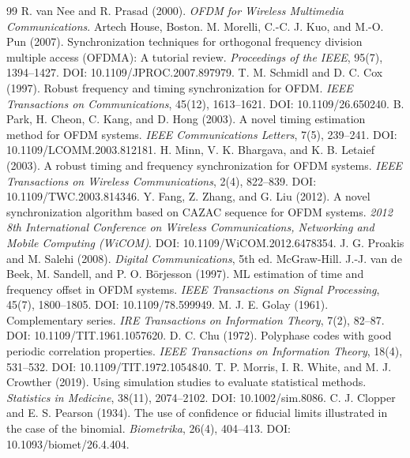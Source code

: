 \begin{thebibliography}{99}
 R. van Nee and R. Prasad (2000). \emph{OFDM for Wireless Multimedia Communications}. Artech House, Boston.
 M. Morelli, C.-C. J. Kuo, and M.-O. Pun (2007). Synchronization techniques for orthogonal frequency division multiple access (OFDMA): A tutorial review. \emph{Proceedings of the IEEE}, 95(7), 1394--1427. DOI: 10.1109/JPROC.2007.897979.
 T. M. Schmidl and D. C. Cox (1997). Robust frequency and timing synchronization for OFDM. \emph{IEEE Transactions on Communications}, 45(12), 1613--1621. DOI: 10.1109/26.650240.
 B. Park, H. Cheon, C. Kang, and D. Hong (2003). A novel timing estimation method for OFDM systems. \emph{IEEE Communications Letters}, 7(5), 239--241. DOI: 10.1109/LCOMM.2003.812181.
 H. Minn, V. K. Bhargava, and K. B. Letaief (2003). A robust timing and frequency synchronization for OFDM systems. \emph{IEEE Transactions on Wireless Communications}, 2(4), 822--839. DOI: 10.1109/TWC.2003.814346.
 Y. Fang, Z. Zhang, and G. Liu (2012). A novel synchronization algorithm based on CAZAC sequence for OFDM systems. \emph{2012 8th International Conference on Wireless Communications, Networking and Mobile Computing (WiCOM)}. DOI: 10.1109/WiCOM.2012.6478354.
 J. G. Proakis and M. Salehi (2008). \emph{Digital Communications}, 5th ed. McGraw-Hill.
 J.-J. van de Beek, M. Sandell, and P. O. B\"orjesson (1997). ML estimation of time and frequency offset in OFDM systems. \emph{IEEE Transactions on Signal Processing}, 45(7), 1800--1805. DOI: 10.1109/78.599949.
 M. J. E. Golay (1961). Complementary series. \emph{IRE Transactions on Information Theory}, 7(2), 82--87. DOI: 10.1109/TIT.1961.1057620.
 D. C. Chu (1972). Polyphase codes with good periodic correlation properties. \emph{IEEE Transactions on Information Theory}, 18(4), 531--532. DOI: 10.1109/TIT.1972.1054840.
 T. P. Morris, I. R. White, and M. J. Crowther (2019). Using simulation studies to evaluate statistical methods. \emph{Statistics in Medicine}, 38(11), 2074--2102. DOI: 10.1002/sim.8086.
 C. J. Clopper and E. S. Pearson (1934). The use of confidence or fiducial limits illustrated in the case of the binomial. \emph{Biometrika}, 26(4), 404--413. DOI: 10.1093/biomet/26.4.404.
\end{thebibliography}
